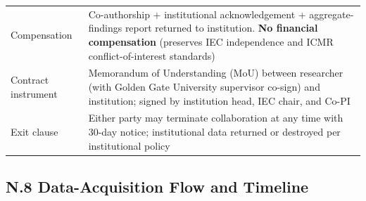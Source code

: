 {\begin{xltabular}{\textwidth}{@{} >{\raggedright\arraybackslash}p{3.6cm} L @{}}
Compensation & Co-authorship + institutional acknowledgement + aggregate-findings report returned to institution. \textbf{No financial compensation} (preserves IEC independence and ICMR conflict-of-interest standards) \\
Contract instrument & Memorandum of Understanding (MoU) between researcher (with Golden Gate University supervisor co-sign) and institution; signed by institution head, IEC chair, and Co-PI \\
Exit clause & Either party may terminate collaboration at any time with 30-day notice; institutional data returned or destroyed per institutional policy \\
\end{xltabular}}

\subsection*{N.8 Data-Acquisition Flow and Timeline}
\label{sec:appendix_n_timeline}

